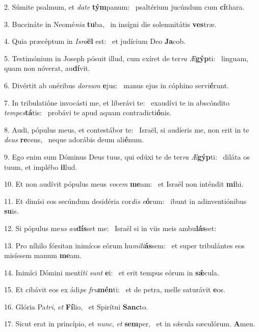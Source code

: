2. Súmite psalmum, et \textit{da}\textit{te} \textbf{tým}panum: \ast\  psaltérium jucúndum cum \textbf{cí}thara.\

3. Buccináte in Neomé\textit{ni}\textit{a} \textbf{tu}ba, \ast\  in insígni die solemnitátis \textbf{ves}træ.\

4. Quia præcéptum in \textit{Is}\textit{ra}\textbf{ël} est: \ast\  et judícium Deo \textbf{Ja}cob.\

5. Testimónium in Joseph pósuit illud, cum exíret de ter\textit{ra} \textit{Æ}\textbf{gýp}ti: \ast\  linguam, quam non nóverat, au\textbf{dí}vit.\

6. Divértit ab onéribus \textit{dor}\textit{sum} \textbf{e}jus: \ast\  manus ejus in cóphino servi\textbf{é}runt.\

7. In tribulatióne invocásti me, et liberávi te: \dag\  exaudívi te in abscóndito \textit{tem}\textit{pes}\textbf{tá}tis: \ast\  probávi te apud aquam contradicti\textbf{ó}nis.\

8. Audi, pópulus meus, et contestábor te: \dag\  Israël, si audíeris me, non erit in te \textit{de}\textit{us} \textbf{re}cens, \ast\  neque adorábis deum ali\textbf{é}num.\

9. Ego enim sum Dóminus Deus tuus, qui edúxi te de ter\textit{ra} \textit{Æ}\textbf{gýp}ti: \ast\  diláta os tuum, et implébo \textbf{il}lud.\

10. Et non audívit pópulus meus \textit{vo}\textit{cem} \textbf{me}am: \ast\  et Israël non inténdit \textbf{mi}hi.\

11. Et dimísi eos secúndum desidéria cor\textit{dis} \textit{e}\textbf{ó}rum: \ast\  ibunt in adinventiónibus \textbf{su}is.\

12. Si pópulus me\textit{us} \textit{au}\textbf{dís}set me: \ast\  Israël si in viis meis ambu\textbf{lás}set:\

13. Pro níhilo fórsitan inimícos eórum hu\textit{mi}\textit{li}\textbf{ás}sem: \ast\  et super tribulántes eos misíssem manum \textbf{me}am.\

14. Inimíci Dómini mentí\textit{ti} \textit{sunt} \textbf{e}i: \ast\  et erit tempus eórum in \textbf{sǽ}cula.\

15. Et cibávit eos ex ádi\textit{pe} \textit{fru}\textbf{mén}ti: \ast\  et de petra, melle saturávit \textbf{e}os.\

16. Glória Pa\textit{tri}, \textit{et} \textbf{Fí}lio, \ast\  et Spirítui \textbf{Sanc}to.\

17. Sicut erat in princípio, et \textit{nunc}, \textit{et} \textbf{sem}per, \ast\  et in sǽcula sæculórum. \textbf{A}men.\

